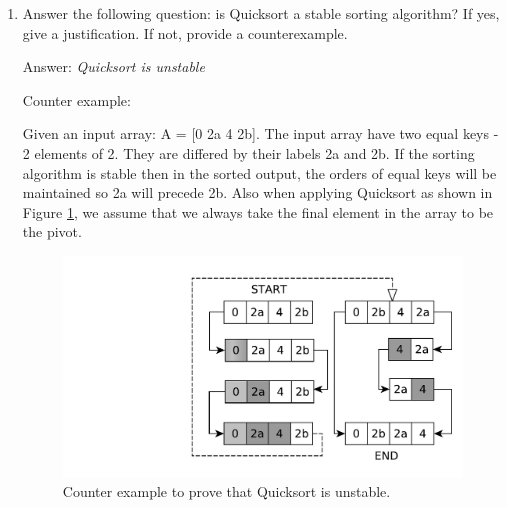 \documentclass[11pts]{report}
\begin{document}
\begin{enumerate}
\begin{lstlisting}
\end{lstlisting}

\textit{Ouputs:}

\begin{lstlisting}
Positive Pass: -4 3 -2 0 2 9 -1 10 0 5 23 4 
Negative Pass: -4 3 -2 0 2 9 -1 10 0 5 23 4 
Positive Pass: -4 23 -2 0 2 9 -1 10 0 5 3 4 
Positive Pass: -4 5 -2 0 2 9 -1 10 0 23 3 4 
Positive Pass: -4 0 -2 0 2 9 -1 10 5 23 3 4 
Zero Pass:     -4 0 -2 0 2 9 -1 10 5 23 3 4 
Negative Pass: -4 -2 0 0 2 9 -1 10 5 23 3 4 
Zero Pass:     -4 -2 0 0 2 9 -1 10 5 23 3 4 
Positive Pass: -4 -2 0 0 10 9 -1 2 5 23 3 4 
Positive Pass: -4 -2 0 0 -1 9 10 2 5 23 3 4 
Negative Pass: -4 -2 -1 0 0 9 10 2 5 23 3 4 
Positive Pass: -4 -2 -1 0 0 9 10 2 5 23 3 4 

Sorted array: -4 -2 -1 0 0 9 10 2 5 23 3 4 
\end{lstlisting}


\item Answer the following question: is Quicksort a stable sorting algorithm? If yes, give a justification. If not, provide a counterexample.

\par Answer: \textit{Quicksort is unstable}
\par Counter example:
\par Given an input array: A = [0 2a 4 2b]. The input array have two equal keys - 2 elements of 2. They are differed by their labels 2a and 2b. If the sorting algorithm is stable then in the sorted output, the orders of equal keys will be maintained so 2a will precede 2b. Also when applying Quicksort as shown in Figure \ref{Fig:2}, we assume that we always take the final element in the array to be the pivot.

\begin{figure}[htbp]
\begin{center}
\includegraphics[scale=0.5]{21.pdf}
\caption{Counter example to prove that Quicksort is unstable.}
\label{Fig:2}
\end{center}
\end{figure}


\end{enumerate}
\end{document}
